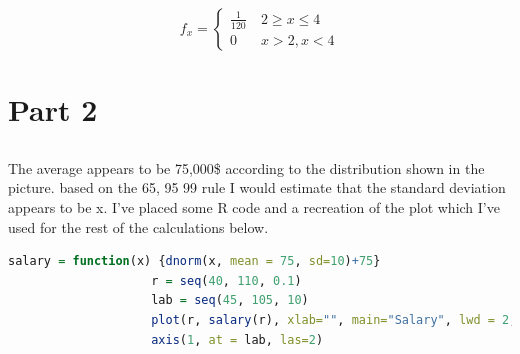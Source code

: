 \documentclass[letterpaper, onecolumn,10pt]{IEEEtran}
\begin{document}
                \[
                    f_x =
                    \begin{cases}
                        \frac{1}{120} &\  2 \geq x \leq 4\\
                        0 &\ x > 2, x < 4 
                    \end{cases}
                \]
                
                
                

        \section{Part 2}
            \subsection{}
                The average appears to be 75,000\$ according to the distribution shown in the picture. based on the 65, 95 99 rule I would estimate that the standard deviation appears to be x. I've placed some R code and a recreation of the plot which I've used for the rest of the calculations below.\\
                
                \begin{lstlisting}[language=R]
                    salary = function(x) {dnorm(x, mean = 75, sd=10)+75}
                    r = seq(40, 110, 0.1)
                    lab = seq(45, 105, 10)
                    plot(r, salary(r), xlab="", main="Salary", lwd = 2, xaxt="n")
                    axis(1, at = lab, las=2)
                \end{lstlisting}
                
\end{document}
